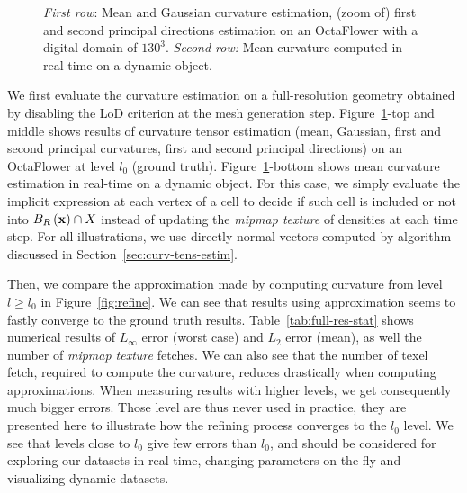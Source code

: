 \documentclass{llncs}
\begin{document}
\begin{figure}
  \vspace{-0.35cm}
  \caption{\emph{First row}: Mean and Gaussian curvature estimation, (zoom of) first and second principal directions estimation on an OctaFlower with a digital domain of $130^3$.
  \emph{Second row:} Mean curvature computed in real-time on a dynamic object.}
  \label{fig:full}
\end{figure}


We first evaluate the curvature estimation on a full-resolution geometry
obtained by disabling the LoD criterion at the mesh generation step.
Figure~\ref{fig:full}-top and middle shows results of curvature tensor
estimation (mean, Gaussian, first and second principal curvatures, first and
second principal directions) on an OctaFlower at level $l_0$ (ground truth).
Figure~\ref{fig:full}-bottom shows mean curvature estimation in real-time on a
dynamic object. For this case, we simply evaluate the implicit expression at
each vertex of a cell to decide if such cell is included or not into
$B_{R}\left(\mathbf{x}\right)\cap X$ instead of updating the \emph{mipmap texture} of
densities at each time step. For all illustrations, we use directly normal
vectors computed by algorithm discussed in Section~\ref{sec:curv-tens-estim}.

Then, we compare the approximation made by computing curvature from level $l \ge
l_0$ in Figure~\ref{fig:refine}. We can see that results using approximation
seems to fastly converge to the ground truth results.
Table~\ref{tab:full-res-stat} shows numerical results of $L_\infty$ error (worst
case) and $L_2$ error (mean), as well the number of \emph{mipmap texture}
fetches. We can also see that the number of texel fetch, required to compute the
curvature, reduces drastically when computing approximations. When measuring
results with higher levels, we get consequently much bigger errors. Those level
are thus never used in practice, they are presented here to illustrate how the
refining process converges to the $l_0$ level. We see that levels close to $l_0$
give few errors than $l_0$, and should be considered for exploring our datasets
in real time, changing parameters on-the-fly and visualizing dynamic datasets.
\end{document}
